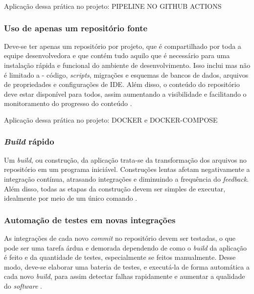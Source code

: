 Aplicação dessa prática no projeto: PIPELINE NO GITHUB ACTIONS

\subsubsection{Uso de apenas um repositório fonte}
Deve-se ter apenas um repositório por projeto, que é compartilhado por toda a equipe desenvolvedora e que contém tudo aquilo que é necessário para uma instalação rápida e funcional do ambiente de desenvolvimento. Isso inclui mas não é limitado a - código, \emph{scripts}, migrações e esquemas de bancos de dados, arquivos de propriedades e configurações de IDE. Além disso, o conteúdo do repositório deve estar disponível para todos, assim aumentando a visibilidade e facilitando o monitoramento do progresso do conteúdo \cite{gitlab-ci-cd,martin-fowler-continuous-integration}.

Aplicação dessa prática no projeto: DOCKER e DOCKER-COMPOSE

\subsubsection{\emph{Build} rápido}
Um \emph{build}, ou construção, da aplicação trata-se da transformação dos arquivos no repositório em um programa iniciável. Construções lentas afetam negativamente a integração contínua, atrasando integrações e diminuindo a frequência do \emph{feedback}. Além disso, todas as etapas da construção devem ser simples de executar, idealmente por meio de um único comando \cite{martin-fowler-continuous-integration}.


\subsubsection{Automação de testes em novas integrações}
As integrações de cada novo \emph{commit} no repositório devem ser testadas, o que pode ser uma tarefa árdua e demorada dependendo de como o \emph{build} da aplicação é feito e da quantidade de testes, especialmente se feitos manualmente. Desse modo, deve-se elaborar uma bateria de testes, e executá-la de forma automática a cada novo \emph{build}, para assim detectar falhas rapidamente e aumentar a qualidade do \emph{software} \cite{gitlab-ci-cd,martin-fowler-continuous-integration}.


